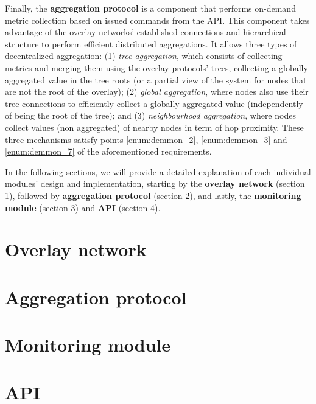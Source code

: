 Finally, the \textbf{aggregation protocol} is a component that performs on-demand metric collection based on issued commands from the API. This component takes advantage of the overlay networks' established connections and hierarchical structure to perform efficient distributed aggregations. It allows three types of decentralized aggregation: (1) \textit{tree aggregation}, which consists of collecting metrics and merging them using the overlay protocols' trees, collecting a globally aggregated value in the tree roots (or a partial view of the system for nodes that are not the root of the overlay); (2) \textit{global aggregation}, where nodes also use their tree connections to efficiently collect a globally aggregated value (independently of being the root of the tree); and (3) \textit{neighbourhood aggregation}, where nodes collect values (non aggregated) of nearby nodes in term of hop proximity. These three mechanisms satisfy points \ref{enum:demmon_2}, \ref{enum:demmon_3} and \ref{enum:demmon_7} of the aforementioned requirements. 

In the following sections, we will provide a detailed explanation of each individual modules' design and implementation, starting by the \textbf{overlay network} (section \ref{sec:overlay_network}), followed by \textbf{aggregation protocol} (section \ref{sec:mon_protocol}), and lastly, the \textbf{monitoring module} (section \ref{sec:mon_module}) and \textbf{API} (section \ref{sec:api}). 

\section{Overlay network} 
\label{sec:overlay_network}


\section{Aggregation protocol}
\label{sec:mon_protocol}


\section{Monitoring module}
\label{sec:mon_module}


\section{API}
\label{sec:api}



